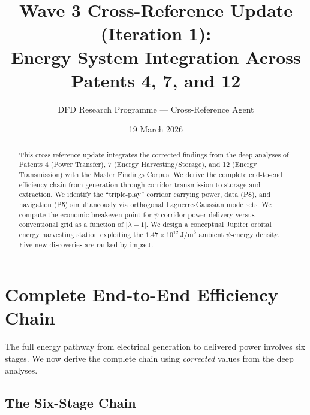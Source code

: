 \documentclass[aps,prd,twocolumn,superscriptaddress]{revtex4-2}
\begin{document}
\title{Wave 3 Cross-Reference Update (Iteration 1):\\
Energy System Integration Across Patents 4, 7, and 12}

\author{DFD Research Programme --- Cross-Reference Agent}
\date{19 March 2026}

\begin{abstract}
This cross-reference update integrates the corrected findings from
the deep analyses of Patents 4 (Power Transfer), 7 (Energy Harvesting/Storage),
and 12 (Energy Transmission) with the Master Findings Corpus.
We derive the complete end-to-end efficiency chain from generation through
corridor transmission to storage and extraction.  We identify the
``triple-play'' corridor carrying power, data (P8), and navigation (P5)
simultaneously via orthogonal Laguerre-Gaussian mode sets.
We compute the economic breakeven point for $\psi$-corridor power delivery
versus conventional grid as a function of $|\lambda-1|$.
We design a conceptual Jupiter orbital energy harvesting station exploiting
the $1.47\times 10^{12}~\text{J/m}^3$ ambient $\psi$-energy density.
Five new discoveries are ranked by impact.
\end{abstract}

\maketitle

\section{Complete End-to-End Efficiency Chain}
\label{sec:efficiency-chain}

The full energy pathway from electrical generation to delivered power
involves six stages.  We now derive the complete chain using
\emph{corrected} values from the deep analyses.

\subsection{The Six-Stage Chain}
\end{document}
